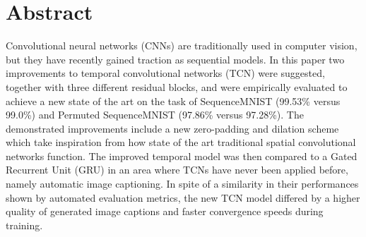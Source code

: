 \documentclass[a4paper, twoside]{article}
\begin{document}
\newpage

\section*{Abstract}
\normalsize{}


Convolutional neural networks (CNNs) are traditionally used in computer vision, but they have recently gained traction as sequential models. In this paper two improvements to temporal convolutional networks (TCN) were suggested, together with three different residual blocks, and were empirically evaluated to achieve a new state of the art on the task of SequenceMNIST (99.53\% versus 99.0\%) and Permuted SequenceMNIST (97.86\% versus 97.28\%). The demonstrated improvements include a new zero-padding and dilation scheme which take inspiration from how state of the art traditional spatial convolutional networks function. The improved temporal model was then compared to a Gated Recurrent Unit (GRU) in an area where TCNs have never been applied before, namely automatic image captioning. In spite of a similarity in their performances shown by automated evaluation metrics, the new TCN model differed by a higher quality of generated image captions and faster convergence speeds during training. 
\end{document}

